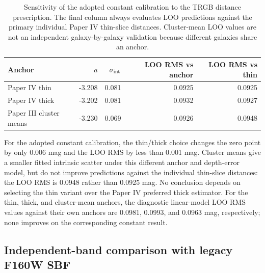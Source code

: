 \documentclass[nodoi,nocopyright]{pas}
\begin{document}
\begin{table}[!tbp]
\centering
\caption{Sensitivity of the adopted constant calibration to the TRGB distance
prescription. The final column
always evaluates LOO predictions against the primary individual Paper IV
thin-slice distances. Cluster-mean LOO values are not an independent
galaxy-by-galaxy validation because different galaxies share an anchor.}
\label{tab:anchor-sensitivity}
\begin{tabular}{lrrrr}
\toprule
Anchor & $a$ & $\sigma_{\rm int}$ &
LOO RMS vs anchor & LOO RMS vs thin \\
\midrule
Paper IV thin & -3.208 & 0.081 & 0.0925 & 0.0925 \\
Paper IV thick & -3.202 & 0.081 & 0.0932 & 0.0927 \\
Paper III cluster means & -3.230 & 0.069 & 0.0926 & 0.0948 \\
\bottomrule
\end{tabular}
\end{table}

For the adopted constant calibration, the thin/thick choice changes the zero
point by only 0.006 mag and the LOO RMS by less than 0.001 mag. Cluster means
give a smaller fitted intrinsic scatter under this different anchor and
depth-error model, but do not improve predictions against the
individual thin-slice distances: the LOO RMS is 0.0948 rather than
0.0925 mag. No conclusion depends on selecting the thin variant over
the Paper IV preferred thick estimator. For the thin, thick, and cluster-mean
anchors, the diagnostic linear-model LOO RMS values against their own anchors
are 0.0981, 0.0993, and 0.0963 mag, respectively; none improves on the
corresponding constant result.

\subsection{Independent-band comparison with legacy F160W SBF}
\end{document}
